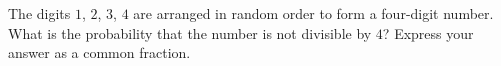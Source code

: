The digits $1$, $2$, $3$, $4$ are arranged in random order to form a four-digit number. What is the probability that the number is not divisible by $4$? Express your answer as a common fraction.
